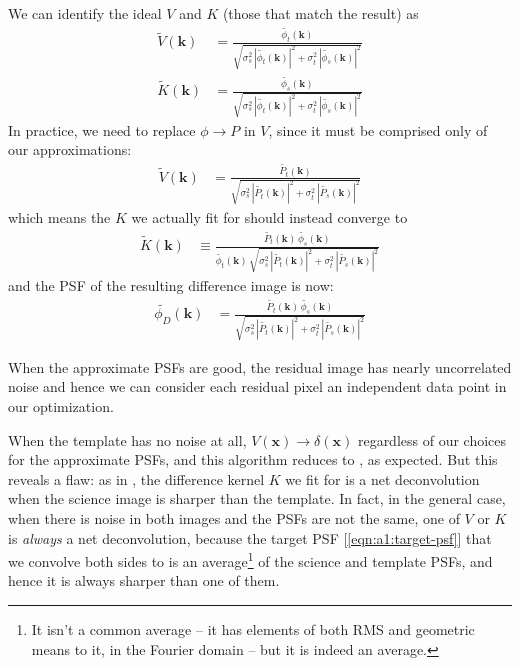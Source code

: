 \documentclass[DM,authoryear,toc]{lsstdoc}
\newcommand{\ZOGY}{\citetalias{2016ApJ...830...27Z}}
\newcommand{\AL}{\citetalias{1998ApJ...503..325A}}
\begin{document}
We can identify the ideal $V$ and $K$ (those that match the \ZOGY{} result) as
\begin{align}
  \widetilde{V}(\symbf{k}) & = \frac{
    \widetilde{\phi_t}(\symbf{k})
  }{
    \sqrt{
      \sigma_s^2 \, \left|\widetilde{\phi_t}(\symbf{k})\right|^2
      + \sigma_t^2 \, \left|\widetilde{\phi_s}(\symbf{k})\right|^2
    }
  } \label{eqn:a1-preconvolution-kernel-ideal}\\
  \widetilde{K}(\symbf{k}) & = \frac{
    \widetilde{\phi_s}(\symbf{k})
  }{
    \sqrt{
      \sigma_s^2 \, \left|\widetilde{\phi_t}(\symbf{k})\right|^2
      + \sigma_t^2 \, \left|\widetilde{\phi_s}(\symbf{k})\right|^2
    }
  } \label{eqn:a1-difference-kernel-ideal}
\end{align}
In practice, we need to replace $\phi \rightarrow P$ in $V$, since it must be comprised only of our approximations:
\begin{align}
  \widetilde{V}(\symbf{k}) & = \frac{
    \widetilde{P_t}(\symbf{k})
  }{
    \sqrt{
      \sigma_s^2 \, \left|\widetilde{P_t}(\symbf{k})\right|^2
      + \sigma_t^2 \, \left|\widetilde{P_s}(\symbf{k})\right|^2
    }
  } \label{eqn:a1-preconvolution-kernel-actual}
\end{align}
which means the $K$ we actually fit for should instead converge to
\begin{align}
  \widetilde{K}(\symbf{k}) & \equiv \frac{
      \widetilde{P_t}(\symbf{k}) \, \widetilde{\phi_s}(\symbf{k})
  }{
    \widetilde{\phi_t}(\symbf{k}) \,
    \sqrt{
      \sigma_s^2 \, \left|\widetilde{P_t}(\symbf{k})\right|^2
      + \sigma_t^2 \, \left|\widetilde{P_s}(\symbf{k})\right|^2
    }
  } \label{eqn:a1-difference-kernel-actual}
\end{align}
and the PSF of the resulting difference image is now:
\begin{align}
  \widetilde{\phi_D}(\symbf{k}) &= \frac{
      \widetilde{P_t}(\symbf{k}) \, \widetilde{\phi_s}(\symbf{k})
    }{
      \sqrt{
          \sigma_s^2 \, \left|\widetilde{P_t}(\symbf{k})\right|^2
          + \sigma_t^2 \, \left|\widetilde{P_s}(\symbf{k})\right|^2
      }
    }\label{eqn:a1:target-psf}
\end{align}

When the approximate PSFs are good, the residual image has nearly uncorrelated noise and hence we can consider each residual pixel an independent data point in our optimization.

When the template has no noise at all, $V(\symbf{x}) \rightarrow \delta(\symbf{x})$ regardless of our choices for the approximate PSFs, and this algorithm reduces to \AL{}, as expected.
But this reveals a flaw: as in \AL{}, the difference kernel $K$ we fit for is a net deconvolution when the science image is sharper than the template.
In fact, in the general case, when there is noise in both images and the PSFs are not the same, one of $V$ or $K$ is \emph{always} a net deconvolution, because the target PSF [\ref{eqn:a1:target-psf}] that we convolve both sides to is an average\footnote{It isn't a common average -- it has elements of both RMS and geometric means to it, in the Fourier domain -- but it is indeed an average.} of the science and template PSFs, and hence it is always sharper than one of them.
\end{document}
